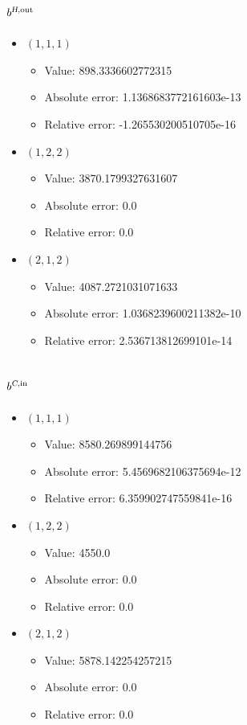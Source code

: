 \documentclass{article}%
\begin{document}
\subsection{$b^{\textsl{H},\text{out}}$}%
\begin{itemize}%
	\item $(1, 1, 1)$%
	\begin{itemize}%
		\item Value: 898.3336602772315%
		\item Absolute error: 1.1368683772161603e-13%
		\item Relative error: -1.265530200510705e-16%
	\end{itemize}%
	\item $(1, 2, 2)$%
	\begin{itemize}%
		\item Value: 3870.1799327631607%
		\item Absolute error: 0.0%
		\item Relative error: 0.0%
	\end{itemize}%
	\item $(2, 1, 2)$%
	\begin{itemize}%
		\item Value: 4087.2721031071633%
		\item Absolute error: 1.0368239600211382e-10%
		\item Relative error: 2.536713812699101e-14%
	\end{itemize}%
\end{itemize}%
\subsection{$b^{\textsl{C},\text{in}}$}%
\begin{itemize}%
	\item $(1, 1, 1)$%
	\begin{itemize}%
		\item Value: 8580.269899144756%
		\item Absolute error: 5.4569682106375694e-12%
		\item Relative error: 6.359902747559841e-16%
	\end{itemize}%
	\item $(1, 2, 2)$%
	\begin{itemize}%
		\item Value: 4550.0%
		\item Absolute error: 0.0%
		\item Relative error: 0.0%
	\end{itemize}%
	\item $(2, 1, 2)$%
	\begin{itemize}%
		\item Value: 5878.142254257215%
		\item Absolute error: 0.0%
		\item Relative error: 0.0%
	\end{itemize}%
\end{itemize}%
\end{document}
